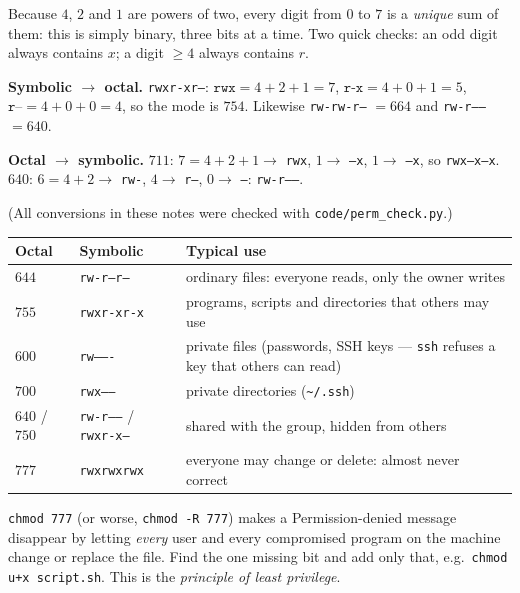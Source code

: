 \documentclass[11pt,a4paper]{article}
\newcommand{\cmd}[1]{\texttt{#1}}
\begin{document}
Because $4$, $2$ and $1$ are powers of two, every digit from $0$ to $7$ is a \emph{unique} sum of them: this is simply binary, three bits at a time. Two quick checks: an odd digit always contains $x$; a digit $\ge 4$ always contains $r$.

\begin{example}
\textbf{Symbolic $\to$ octal.} \texttt{rwxr-xr--}: $\texttt{rwx} = 4+2+1 = 7$, $\texttt{r-x} = 4+0+1 = 5$, $\texttt{r--} = 4+0+0 = 4$, so the mode is $754$. Likewise \texttt{rw-rw-r--} $= 664$ and \texttt{rw-r-----} $= 640$.

\textbf{Octal $\to$ symbolic.} $711$: $7 = 4+2+1 \to$ \texttt{rwx}, $1 \to$ \texttt{--x}, $1 \to$ \texttt{--x}, so \texttt{rwx--x--x}. $640$: $6 = 4+2 \to$ \texttt{rw-}, $4 \to$ \texttt{r--}, $0 \to$ \texttt{---}: \texttt{rw-r-----}.

(All conversions in these notes were checked with \cmd{code/perm\_check.py}.)
\end{example}

\begin{center}
\small
\begin{tabularx}{\linewidth}{@{}l l X@{}}
\toprule
\textbf{Octal} & \textbf{Symbolic} & \textbf{Typical use} \\
\midrule
$644$ & \texttt{rw-r--r--} & ordinary files: everyone reads, only the owner writes \\
$755$ & \texttt{rwxr-xr-x} & programs, scripts and directories that others may use \\
$600$ & \texttt{rw-------} & private files (passwords, SSH keys --- \cmd{ssh} refuses a key that others can read) \\
$700$ & \texttt{rwx------} & private directories (\texttt{\textasciitilde/.ssh}) \\
$640$ / $750$ & \texttt{rw-r-----} / \texttt{rwxr-x---} & shared with the group, hidden from others \\
$777$ & \texttt{rwxrwxrwx} & everyone may change or delete: almost never correct \\
\bottomrule
\end{tabularx}
\end{center}

\begin{keyidea}
\texttt{chmod 777} (or worse, \texttt{chmod -R 777}) makes a Permission-denied message disappear by letting \emph{every} user and every compromised program on the machine change or replace the file. Find the one missing bit and add only that, e.g.\ \texttt{chmod u+x script.sh}. This is the \emph{principle of least privilege}.
\end{keyidea}
\end{document}

